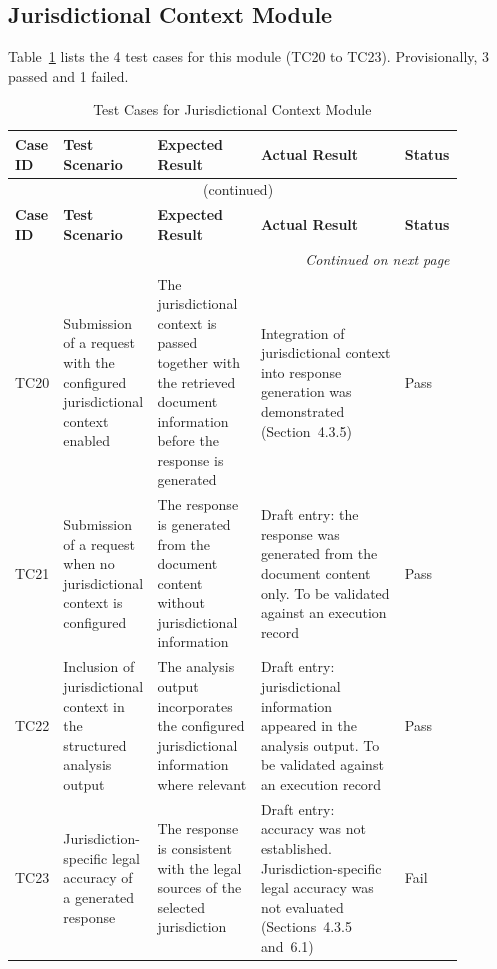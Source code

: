 \documentclass[12pt,a4paper,oneside]{report}
\begin{document}
\subsection{Jurisdictional Context Module}
Table~\ref{tab:juris} lists the 4 test cases for this module (TC20 to TC23). Provisionally, 3 passed and 1 failed.
{\footnotesize
\setlength{\tabcolsep}{3pt}
\renewcommand{\arraystretch}{1.15}
\begin{longtable}{|p{0.075\linewidth}|p{0.19\linewidth}|p{0.23\linewidth}|p{0.32\linewidth}|p{0.08\linewidth}|}
\caption{Test Cases for Jurisdictional Context Module}\label{tab:juris}\\
\hline
\textbf{Case ID} & \textbf{Test Scenario} & \textbf{Expected Result} & \textbf{Actual Result} & \textbf{Status}\\
\hline
\endfirsthead
\multicolumn{5}{c}{\tablename~\thetable{} (continued)}\\
\hline
\textbf{Case ID} & \textbf{Test Scenario} & \textbf{Expected Result} & \textbf{Actual Result} & \textbf{Status}\\
\hline
\endhead
\hline
\multicolumn{5}{r}{\emph{Continued on next page}}\\
\endfoot
\hline
\endlastfoot
TC20 & Submission of a request with the configured jurisdictional context enabled & The jurisdictional context is passed together with the retrieved document information before the response is generated & Integration of jurisdictional context into response generation was demonstrated (Section~4.3.5) & Pass\\
\hline
TC21 & Submission of a request when no jurisdictional context is configured & The response is generated from the document content without jurisdictional information & Draft entry: the response was generated from the document content only. To be validated against an execution record & Pass\\
\hline
TC22 & Inclusion of jurisdictional context in the structured analysis output & The analysis output incorporates the configured jurisdictional information where relevant & Draft entry: jurisdictional information appeared in the analysis output. To be validated against an execution record & Pass\\
\hline
TC23 & Jurisdiction-specific legal accuracy of a generated response & The response is consistent with the legal sources of the selected jurisdiction & Draft entry: accuracy was not established. Jurisdiction-specific legal accuracy was not evaluated (Sections~4.3.5 and~6.1) & Fail\\
\end{longtable}
}
\end{document}
